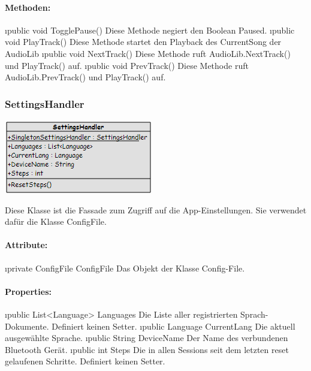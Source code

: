 \documentclass[../entwurf.tex]{subfiles}
\begin{document}
				\paragraph{Methoden:}
					\begin{itemize}
						\i{public void TogglePause()} Diese Methode negiert den Boolean Paused.
						\i{public void PlayTrack()} Diese Methode startet den Playback des CurrentSong der AudioLib
						\i{public void NextTrack()} Diese Methode ruft AudioLib.NextTrack() und PlayTrack() auf.
						\i{public void PrevTrack()} Diese Methode ruft AudioLib.PrevTrack() und PlayTrack() auf.
					\end{itemize}
			\subsubsection{SettingsHandler}
				\begin{minipage}{0.45\textwidth}
					\includegraphics[width=\textwidth,height=\textheight,keepaspectratio]{../graphics/m_klassen/SettingsHandler.png}
				\end{minipage}
				\begin{minipage}{0.55\textwidth}
					Diese Klasse ist die Fassade zum Zugriff auf die App-Einstellungen. Sie verwendet dafür die Klasse ConfigFile.
				\end{minipage}
				\paragraph{Attribute:}
					\begin{itemize}
						\i{private ConfigFile ConfigFile} Das Objekt der Klasse Config-File.
					\end{itemize}
				\paragraph{Properties:}
					\begin{itemize}
						\i{public List<Language> Languages} Die Liste aller registrierten Sprach-Dokumente. Definiert keinen Setter.
						\i{public Language CurrentLang} Die aktuell ausgewählte Sprache.
						\i{public String DeviceName} Der Name des verbundenen Bluetooth Gerät.
						\i{public int Steps} Die in allen Sessions seit dem letzten reset gelaufenen Schritte. Definiert keinen Setter.
					\end{itemize}
\end{document}

